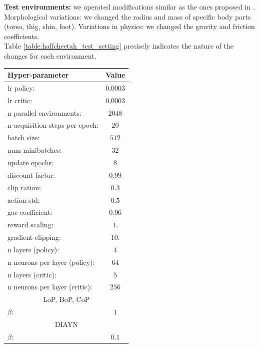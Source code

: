 \textbf{Test environments:} we operated modifications similar as the ones proposed in \citep{henderson2017multitask}. Morphological variations: we changed the radius and mass of specific body parts (torso, thig, shin, foot). Variations in physics: we changed the gravity and friction coefficients. \\
Table \ref{table:halfcheetah_test_setting} precisely indicates the nature of the changes for each environment.

\begin{table}[h!]
\centering

\label{table:halfcheetah_test_setting}
\end{table}

\newpage


\begin{table}[h!]
\begin{center}
\begin{tabular}{l|c} \toprule
   \textbf{Hyper-parameter} & \textbf{Value} \\ \hline
    lr policy: &  $0.0003$\\
    lr critic: &  $0.0003$\\
    n parallel environments: & $2048$ \\
    n acquisition steps per epoch: & $20$ \\
    batch size: & $512$ \\
    num minibatches: & $32$ \\
    update epochs: & $8$ \\
    discount factor: &  $0.99$\\
    clip ration: &  $0.3$\\
    action std: &  $0.5$\\
    gae coefficient: &  $0.96$\\
    reward scaling: &  $1.$\\
    gradient clipping: & $10.$ \\ 
    n layers (policy): & $4$ \\ 
    n neurons per layer (policy): & $64$ \\
    n layers (critic): & $5$ \\ 
    n neurons per layer (critic): & $256$ \\\toprule
    \multicolumn{2}{c}{LoP, BoP, CoP} \\ 
    \hline
    $\beta$: & $1$ \\\toprule
    \multicolumn{2}{c}{DIAYN} \\ 
    \hline
    $\beta$: & $0.1$ \\

\end{tabular}
\end{center}
\end{table}
